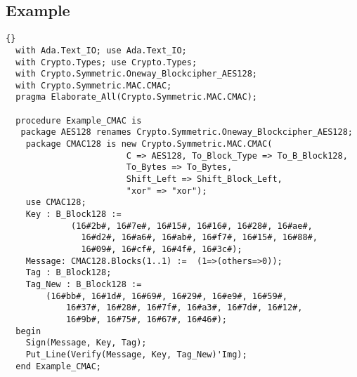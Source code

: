 \subsection*{Example}
\begin{lstlisting}{}
  with Ada.Text_IO; use Ada.Text_IO;
  with Crypto.Types; use Crypto.Types;
  with Crypto.Symmetric.Oneway_Blockcipher_AES128;
  with Crypto.Symmetric.MAC.CMAC;
  pragma Elaborate_All(Crypto.Symmetric.MAC.CMAC);

  procedure Example_CMAC is
   package AES128 renames Crypto.Symmetric.Oneway_Blockcipher_AES128;
    package CMAC128 is new Crypto.Symmetric.MAC.CMAC(
						C => AES128, To_Block_Type => To_B_Block128,
						To_Bytes => To_Bytes, 
						Shift_Left => Shift_Block_Left, 
						"xor" => "xor");
    use CMAC128;
    Key : B_Block128 := 
             (16#2b#, 16#7e#, 16#15#, 16#16#, 16#28#, 16#ae#,
		       16#d2#, 16#a6#, 16#ab#, 16#f7#, 16#15#, 16#88#,
		       16#09#, 16#cf#, 16#4f#, 16#3c#);
    Message: CMAC128.Blocks(1..1) :=  (1=>(others=>0));
    Tag : B_Block128;
    Tag_New : B_Block128 := 
        (16#bb#, 16#1d#, 16#69#, 16#29#, 16#e9#, 16#59#,
			16#37#, 16#28#, 16#7f#, 16#a3#, 16#7d#, 16#12#,
			16#9b#, 16#75#, 16#67#, 16#46#);
  begin
    Sign(Message, Key, Tag);
    Put_Line(Verify(Message, Key, Tag_New)'Img);
  end Example_CMAC;
\end{lstlisting}


